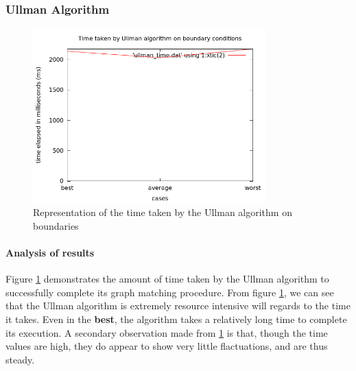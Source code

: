 \subsubsection{Ullman Algorithm}
\begin{figure}[H]
  \begin{center}
      \includegraphics[width=0.8\textwidth]{ullman_time.png}
  \end{center}    
  \caption{Representation of the time taken by the Ullman algorithm on boundaries}
  \label{fig:case_ullman_time}
\end{figure} 

\paragraph{Analysis of results}
Figure \ref{fig:case_ullman_time} demonstrates the amount of time taken by the Ullman algorithm to successfully complete its graph matching procedure.
From figure \ref{fig:case_ullman_time}, we can see that the Ullman algorithm is extremely resource intensive will regards to the time it takes. Even in the 
\textbf{best}, the algorithm takes a relatively long time to complete its execution.\newline\newline
A secondary observation made from \ref{fig:case_ullman_time} is that, though the time values are high, they do appear to show very little flactuations, and are thus steady.

